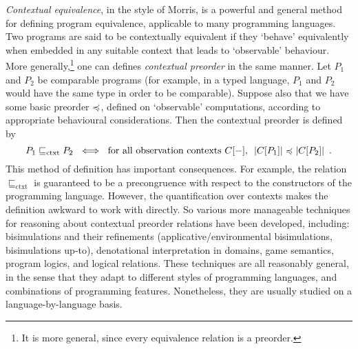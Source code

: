 \emph{Contextual equivalence}, in the style of Morris,
is a powerful and general method for defining program equivalence, applicable to many 
programming languages. 
Two programs are said to be contextually equivalent if 
they `behave' equivalently when embedded in any suitable context that leads to `observable' behaviour. 
More generally,\footnote{It is more general, since every equivalence relation is a preorder.} one can defines \emph{contextual preorder} in the same manner. Let $P_1$ and $P_2$ be comparable programs (for example, in a typed language, $P_1$ and $P_2$ would  have the same type in order to be comparable). Suppose also that we have some {basic preorder} $\preccurlyeq$, defined on `observable' computations, according to appropriate behavioural considerations. Then the contextual preorder is defined by
\begin{equation}
\label{equation:contextual-preorder}
P_1 \sqsubseteq_\text{ctxt} P_2 ~ \iff ~
\text{for all observation contexts $C[-]$, $~ |C[P_1]| \preccurlyeq |C[P_2]|$} \enspace . 
\end{equation}
This method of definition has important consequences. For example, the relation
$\sqsubseteq_\text{ctxt}$ is guaranteed to be a precongruence with respect 
to the constructors of the programming language.
However, the quantification over contexts makes the definition awkward to work with directly.
So various more manageable techniques for reasoning about contextual preorder relations have been developed, including:
bisimulations 
and their refinements (applicative/environmental bisimulations, 
bisimulations up-to), %
denotational interpretation in domains, %
game semantics, %
program logics,
and logical relations. %
These techniques are all reasonably general, in the sense that they adapt to different styles of programming languages, and combinations of programming features. Nonetheless, they are usually studied on a language-by-language basis.

